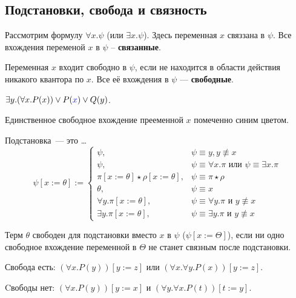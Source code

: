\subsection{Подстановки, свобода и связность}
\begin{definition}
    Рассмотрим формулу $\forall x.\psi$ (или $\exists x.\psi$). Здесь переменная $x$ связзана в $\psi$. Все вхождения переменой $x$ в $\psi$ -- \textbf{связанные}.
\end{definition}
\begin{definition}
    Переменная $x$ входит свободно в $\psi$, если не находится в области действия никакого квантора по $x$.
Все её вхождения в $\psi$ --- \textbf{свободные}.
\end{definition}
\begin{example}
    $\exists y.(\forall x.P(x))\vee P({\color{blue}x}) \vee Q(y)$.

    Единственное свободное вхождение прееменной $x$ помеченно синим цветом.
\end{example}

\begin{definition} Подстановка~--- это \ldots
    \[ \psi[x := \theta] := \left\{\begin{array}{ll}\psi, & \psi\equiv y, y \not\equiv x\\
    \psi, & \psi\equiv\forall x.\pi \textrm{ или } \psi\equiv\exists x.\pi\\
    \pi[x := \theta] \star \rho [x := \theta], & \psi\equiv \pi\star\rho\\
    \theta, & \psi\equiv x\\
    \forall y.\pi[x := \theta], & \psi \equiv \forall y.\pi \textrm{ и } y \not\equiv x\\
    \exists y.\pi[x := \theta], & \psi \equiv \exists y.\pi \textrm{ и } y \not\equiv x
\end{array}\right. \]
\end{definition}


\begin{definition}
    Терм $\theta$ свободен для подстановки вместо $x$ в $\psi$ ($\psi [x:=\Theta]$), если ни одно свободное вхождение переменной в $\Theta$ не станет связным после подстановки.
\end{definition}

Свобода есть: $(\forall x. P(y)) [y:=z]$ или $(\forall x. \forall y. P(x)) [y:=z]$.

Cвободы нет: $(\forall x.P(y))[y:=x]$ и $(\forall y.\forall x.P(t))[t:=y]$.


